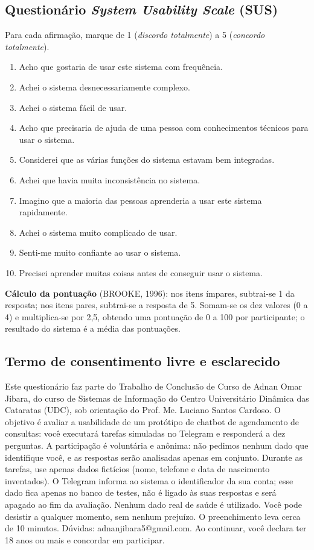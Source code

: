 \documentclass[12pt,a4paper]{extarticle}
\begin{document}
\subsection*{Questionário \textit{System Usability Scale} (SUS)}
Para cada afirmação, marque de 1 (\textit{discordo totalmente}) a 5 (\textit{concordo totalmente}).
\begin{enumerate}
    \item Acho que gostaria de usar este sistema com frequência.
    \item Achei o sistema desnecessariamente complexo.
    \item Achei o sistema fácil de usar.
    \item Acho que precisaria de ajuda de uma pessoa com conhecimentos técnicos para usar o sistema.
    \item Considerei que as várias funções do sistema estavam bem integradas.
    \item Achei que havia muita inconsistência no sistema.
    \item Imagino que a maioria das pessoas aprenderia a usar este sistema rapidamente.
    \item Achei o sistema muito complicado de usar.
    \item Senti-me muito confiante ao usar o sistema.
    \item Precisei aprender muitas coisas antes de conseguir usar o sistema.
\end{enumerate}
\textbf{Cálculo da pontuação} (BROOKE, 1996): nos itens ímpares, subtrai-se 1 da resposta; nos itens pares, subtrai-se a resposta de 5. Somam-se os dez valores (0 a 4) e multiplica-se por 2,5, obtendo uma pontuação de 0 a 100 por participante; o resultado do sistema é a média das pontuações.

\subsection*{Termo de consentimento livre e esclarecido}
Este questionário faz parte do Trabalho de Conclusão de Curso de Adnan Omar Jibara, do curso de Sistemas de Informação do Centro Universitário Dinâmica das Cataratas (UDC), sob orientação do Prof. Me. Luciano Santos Cardoso. O objetivo é avaliar a usabilidade de um protótipo de chatbot de agendamento de consultas: você executará tarefas simuladas no Telegram e responderá a dez perguntas. A participação é voluntária e anônima: não pedimos nenhum dado que identifique você, e as respostas serão analisadas apenas em conjunto. Durante as tarefas, use apenas dados fictícios (nome, telefone e data de nascimento inventados). O Telegram informa ao sistema o identificador da sua conta; esse dado fica apenas no banco de testes, não é ligado às suas respostas e será apagado ao fim da avaliação. Nenhum dado real de saúde é utilizado. Você pode desistir a qualquer momento, sem nenhum prejuízo. O preenchimento leva cerca de 10 minutos. Dúvidas: adnanjibara5@gmail.com. Ao continuar, você declara ter 18 anos ou mais e concordar em participar.
\end{document}
